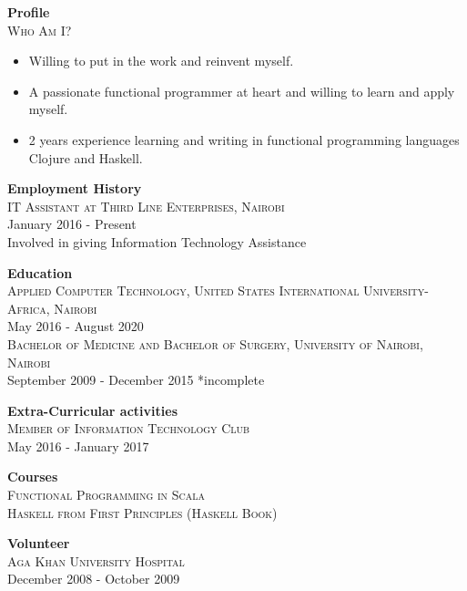 \documentclass[11pt,a4paper]{article}
\begin{document}
\begin{minipage}[t]{0.5\textwidth}
\begin{labeling}{\faUser}
\item [\faUser] {\large \textbf{Profile}}\\[0.3cm]
 {\large \textsc{Who Am I?}}
 \begin{itemize}
 \item Willing to put in the work and reinvent myself.
 \item A passionate functional programmer at heart and willing to learn and apply myself.
 \item 2 years experience learning and writing in functional programming languages Clojure and Haskell.
 \end{itemize}
 \vspace{0.4cm}
\item [\faSuitcase] {\large \textbf{Employment History}}\\[0.3cm]
  \textsc{IT Assistant at Third Line Enterprises, Nairobi}\\[0.2cm]
  \textcolor{gray!100}{January 2016 - Present}\\[0.1cm]
  Involved in giving Information Technology Assistance
  \vspace{0.4cm}
\item [\faGraduationCap] {\large \textbf{Education}}\\[0.3cm]
  \textsc{Applied Computer Technology, United States International University-Africa, Nairobi}\\[0.2cm]
    \textcolor{gray!100}{May 2016 - August 2020}\\[0.3cm]
  \textsc{Bachelor of Medicine and Bachelor of Surgery, University of Nairobi, Nairobi}\\[0.2cm]
  \textcolor{gray!100}{September 2009 - December 2015}
  *incomplete
  \vspace{0.4cm}
\item [\faLeaf] {\large \textbf{Extra-Curricular activities}}\\[0.3cm]
  \textsc{Member of Information Technology Club}\\[0.2cm]
  \textcolor{gray!100}{May 2016 - January 2017}
  \vspace{0.4cm}
\item [\faBook] {\large \textbf{Courses}}\\[0.3cm]
  \textsc{Functional Programming in Scala}\\[0.2cm]
  \textsc{Haskell from First Principles (Haskell Book) }\\[0.2cm]
  \vspace{0.4cm}
\item [\faUsers] {\large \textbf{Volunteer}}\\[0.3cm]
  \textsc{Aga Khan University Hospital}\\[0.2cm]
  \textcolor{gray!100}{December 2008 - October 2009}
\end{labeling}
\end{minipage}%
\end{document}
